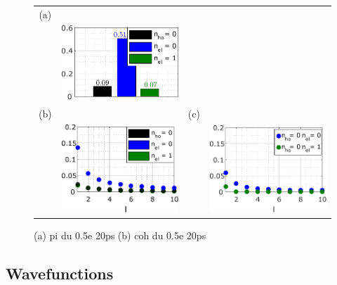 \begin{figure}[hptb]
	\begin{center}
		\begin{tabular}{c c c c}
			(a) & & &   \\ 
			& \includegraphics[width = 5cm]{./appD/JnlData_leviton_20ps_0_5e_51mK_Projected_Gradient_Method_proba} &
			&  \\
			(b) & & (c) & \\
			& \includegraphics[width = 5cm]{./appD/JnlData_leviton_20ps_0_5e_51mK_Projected_Gradient_Method_coh_inter_period} &
			& \includegraphics[width = 5cm]{./appD/JnlData_leviton_20ps_0_5e_51mK_Projected_Gradient_Method_coh_el_ho}
		\end{tabular} 
	\end{center}
	\caption{(a) pi du 0.5e 20ps (b) coh du 0.5e 20ps}
	\label{fig: Jnl du 0.5e 20ps}
\end{figure}

\subsection{Wavefunctions}

